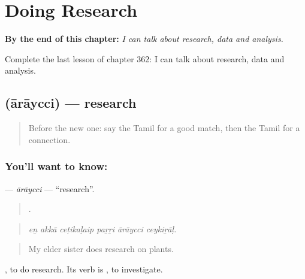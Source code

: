 
\chapter{Doing Research}
\label{ch:ta-doing-research}

\begin{chapteropening}
\textbf{By the end of this chapter:} \emph{I can talk about research, data and analysis.}

Complete the last lesson of chapter 362: I can talk about research, data and analysis.
\end{chapteropening}

\section[\texorpdfstring{\ta{ஆராய்ச்சி} (ārāycci)}{ஆராய்ச்சி (ārāycci)}]{ (ārāycci) — research}

\label{lesson:TA-C362-araycci}



\begin{quote}
Before the new one: say the Tamil for a good match, then the Tamil for a connection.
\end{quote}

\subsection*{You'll want to know: }
\textbf{} — \emph{ārāycci} — \textquotedblleft{}research\textquotedblright{}.

\begin{quote}
     .
\end{quote}

\begin{quote}
\emph{eṉ akkā ceṭikaḷaip paṟṟi ārāycci ceykiṟāḷ.}
\end{quote}

\begin{quote}
My elder sister does research on plants.
\end{quote}

 , to do research. Its verb is , to investigate.

